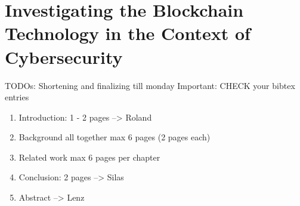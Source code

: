 \chapter{Investigating the Blockchain Technology
  in the Context of Cybersecurity}




TODOs:
Shortening and finalizing till monday
Important: CHECK your bibtex entries
\begin{enumerate}
	\item Introduction: 1 - 2 pages --> Roland
	\item Background all together max 6 pages (2 pages each)
	\item Related work max 6 pages per chapter
	\item Conclusion: 2 pages --> Silas
	\item Abstract --> Lenz
\end{enumerate}


\newpage

\minitoc %

\newpage


\newpage


\newpage


\newpage



\nocite{*}


